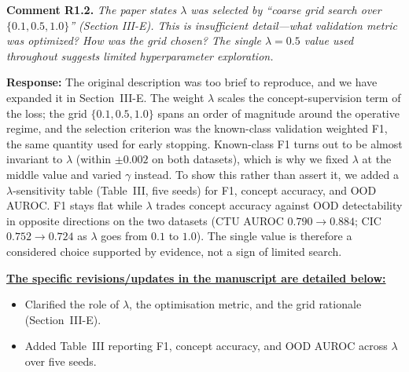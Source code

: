 \documentclass[11pt]{article}
\newcommand{\cmt}[2]{\medskip\noindent\textbf{Comment #1.} \textit{#2}\par}
\newcommand{\resp}{\smallskip\par\noindent\textbf{Response:} }
\newcommand{\revs}{\smallskip\par\noindent\underline{\textbf{The specific revisions/updates in the manuscript are detailed below:}}\par}
\begin{document}
\cmt{R1.2}{The paper states $\lambda$ was selected by ``coarse grid search over
$\{0.1,0.5,1.0\}$'' (Section III-E). This is insufficient detail---what
validation metric was optimized? How was the grid chosen? The single
$\lambda=0.5$ value used throughout suggests limited hyperparameter exploration.}
\resp The original description was too brief to reproduce, and we have expanded it
in Section~III-E. The weight $\lambda$ scales the concept-supervision term of the
loss; the grid $\{0.1,0.5,1.0\}$ spans an order of magnitude around the operative
regime, and the selection criterion was the known-class validation weighted F1,
the same quantity used for early stopping. Known-class F1 turns out to be almost
invariant to $\lambda$ (within $\pm0.002$ on both datasets), which is why we fixed
$\lambda$ at the middle value and varied $\gamma$ instead. To show this rather
than assert it, we added a $\lambda$-sensitivity table (Table~III, five seeds) for
F1, concept accuracy, and OOD AUROC. F1 stays flat while $\lambda$ trades concept
accuracy against OOD detectability in opposite directions on the two datasets (CTU
AUROC $0.790{\to}0.884$; CIC $0.752{\to}0.724$ as $\lambda$ goes from $0.1$ to
$1.0$). The single value is therefore a considered choice supported by evidence,
not a sign of limited search.
\revs
\begin{itemize}
  \item Clarified the role of $\lambda$, the optimisation metric, and the grid
  rationale (Section~III-E).
  \item Added Table~III reporting F1, concept accuracy, and OOD AUROC across
  $\lambda$ over five seeds.
\end{itemize}
\end{document}
